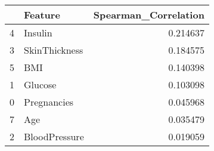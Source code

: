 \begin{tabular}{llr}
\toprule
 & Feature & Spearman_Correlation \\
\midrule
4 & Insulin & 0.214637 \\
3 & SkinThickness & 0.184575 \\
5 & BMI & 0.140398 \\
1 & Glucose & 0.103098 \\
0 & Pregnancies & 0.045968 \\
7 & Age & 0.035479 \\
2 & BloodPressure & 0.019059 \\
\bottomrule
\end{tabular}
